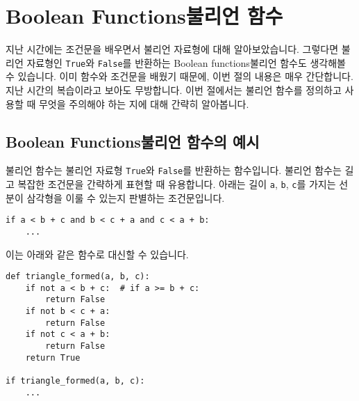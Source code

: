 \documentclass[../main.tex]{subfiles}
\begin{document}
\section{Boolean Functions불리언 함수}
지난 시간에는 조건문을 배우면서 불리언 자료형에 대해 알아보았습니다.
그렇다면 불리언 자료형인 \texttt{True}와 \texttt{False}를 반환하는 Boolean functions불리언 함수도 생각해볼 수 있습니다.
이미 함수와 조건문을 배웠기 때문에, 이번 절의 내용은 매우 간단합니다.
지난 시간의 복습이라고 보아도 무방합니다.
이번 절에서는 불리언 함수를 정의하고 사용할 때 무엇을 주의해야 하는 지에 대해 간략히 알아봅니다.

\subsection{Boolean Functions불리언 함수의 예시}
불리언 함수는 불리언 자료형 \texttt{True}와 \texttt{False}를 반환하는 함수입니다.
불리언 함수는 길고 복잡한 조건문을 간략하게 표현할 때 유용합니다.
아래는 길이 \texttt{a}, \texttt{b}, \texttt{c}를 가지는 선분이 삼각형을 이룰 수 있는지 판별하는 조건문입니다.
\begin{verbatim}
if a < b + c and b < c + a and c < a + b:
    ...
\end{verbatim} 
이는 아래와 같은 함수로 대신할 수 있습니다.
\begin{verbatim}
def triangle_formed(a, b, c):
    if not a < b + c:  # if a >= b + c:
        return False
    if not b < c + a:
        return False
    if not c < a + b:
        return False
    return True

if triangle_formed(a, b, c):
    ...
\end{verbatim}
\end{document}
